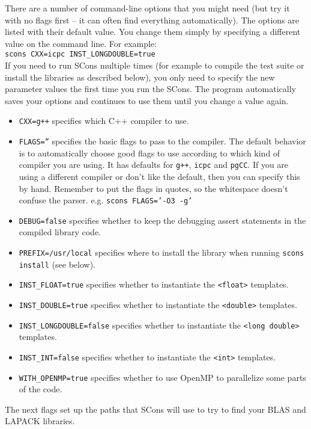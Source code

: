 \documentclass[twoside,letterpaper,11pt]{article}
\renewcommand{\tt}[1]{{\lstinline {#1}}}
\begin{document}
\begin{enumerate}
There are a number of command-line options that you might need (but try it with no flags
first -- it can often find everything automatically).  
The options are listed 
with their default value.  You change them simply by specifying a different value
on the command line.  For example:\\
\texttt{scons CXX=icpc INST\_LONGDOUBLE=true}\\
If you need to run SCons multiple times (for example to compile the test suite or install
the libraries as described below), you only need to specify the new parameter values the first
time you run the SCons.
The program automatically saves your options and continues to use them until you
change a value again.
\begin{itemize}
\item \texttt{CXX=g++} specifies which C++ compiler to use.
\item \texttt{FLAGS=''} specifies the basic flags to pass to the compiler.  The default behavior is to
automatically choose good flags to use according to which kind of compiler you are using.
It has defaults for \texttt{g++}, \texttt{icpc} and \texttt{pgCC}.  If you are using a different compiler or don't
like the default, then you can specify this by hand.  
Remember to put the flags in quotes,
so the whitespace doesn't confuse the parser.  e.g. \texttt{scons FLAGS='-O3 -g'}
\item \texttt{DEBUG=false} specifies whether to keep the debugging assert statements in the compiled library code.  
\item \texttt{PREFIX=/usr/local} specifies where to install the library when running \texttt{scons install} (see below).
\item \texttt{INST\_FLOAT=true} specifies whether to instantiate the \tt{<float>} templates.
\item \texttt{INST\_DOUBLE=true} specifies whether to instantiate the \tt{<double>} templates.
\item \texttt{INST\_LONGDOUBLE=false} specifies whether to instantiate the \tt{<long double>} templates.
\item \texttt{INST\_INT=false} specifies whether to instantiate the \tt{<int>} templates.
\item \texttt{WITH\_OPENMP=true} specifies whether to use OpenMP to parallelize some parts of the code.
\end{itemize}
The next flags set up the paths that SCons will use to try to find your BLAS and LAPACK libraries.

\end{enumerate}
\end{document}
